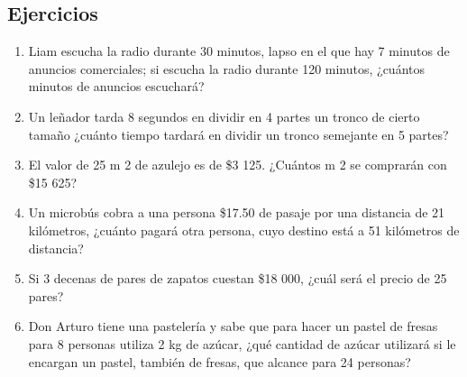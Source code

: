 \subsection{Ejercicios}
\begin{enumerate}
    \item Liam escucha la radio durante 30 minutos, lapso en el que hay 7 minutos de anuncios comerciales; si escucha la radio durante 120 minutos, ¿cuántos minutos de anuncios escuchará?
    \item Un leñador tarda 8 segundos en dividir en 4 partes un tronco de cierto tamaño ¿cuánto tiempo tardará en dividir un tronco semejante en 5 partes?
    \item El valor de 25 m 2 de azulejo es de \$3 125. ¿Cuántos m 2 se comprarán con \$15 625?
    \item Un microbús cobra a una persona \$17.50 de pasaje por una distancia de 21 kilómetros, ¿cuánto pagará otra persona, cuyo destino está a 51 kilómetros de distancia?
    \item Si 3 decenas de pares de zapatos cuestan \$18 000, ¿cuál será el precio de 25 pares?
    \item Don Arturo tiene una pastelería y sabe que para hacer un pastel de fresas para 8 personas utiliza 2 kg de azúcar, ¿qué cantidad de azúcar utilizará si le encargan un pastel, también de fresas, que alcance para 24 personas?
\end{enumerate}